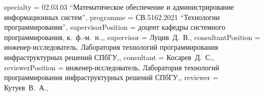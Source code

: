 {    specialty          = {02.03.03 \enquote{Математическое обеспечение и администрирование информационных систем}},
    programme          = {СВ.5162.2021 \enquote{Технологии программирования}},
    supervisorPosition = {доцент кафедры системного программирования, к.~ф.-м.~н.,},
    supervisor         = {Луцив~Д.~В.},
    consultantPosition = {инженер-исследователь, Лаборатория технологий программирования инфраструктурных решений СПбГУ,},
    consultant         = {Косарев~Д.~С.},
    reviewerPosition   = {инженер-исследователь, Лаборатория технологий программирования инфраструктурных решений СПбГУ,},
    reviewer           = {Кутуев~В.~А.},
}

